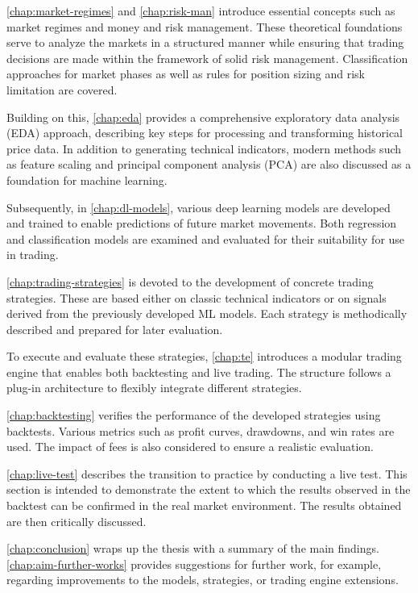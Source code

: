 \autoref{chap:market-regimes} and \autoref{chap:risk-man} introduce essential concepts such as market regimes and money and risk management.
These theoretical foundations serve to analyze the markets in a structured manner while ensuring that trading decisions are made within the framework of solid risk management.
Classification approaches for market phases as well as rules for position sizing and risk limitation are covered.


Building on this, \autoref{chap:eda} provides a comprehensive exploratory data analysis (EDA) approach, describing key steps for processing and transforming historical price data.
In addition to generating technical indicators, modern methods such as feature scaling and principal component analysis (PCA) are also discussed as a foundation for machine learning.

Subsequently, in \autoref{chap:dl-models}, various deep learning models are developed and trained to enable predictions of future market movements.
Both regression and classification models are examined and evaluated for their suitability for use in trading.

\autoref{chap:trading-strategies} is devoted to the development of concrete trading strategies.
These are based either on classic technical indicators or on signals derived from the previously developed ML models.
Each strategy is methodically described and prepared for later evaluation.

To execute and evaluate these strategies, \autoref{chap:te} introduces a modular trading engine that enables both backtesting and live trading.
The structure follows a plug-in architecture to flexibly integrate different strategies.

\autoref{chap:backtesting} verifies the performance of the developed strategies using backtests.
Various metrics such as profit curves, drawdowns, and win rates are used.
The impact of fees is also considered to ensure a realistic evaluation.

\autoref{chap:live-test} describes the transition to practice by conducting a live test.
This section is intended to demonstrate the extent to which the results observed in the backtest can be confirmed in the real market environment.
The results obtained are then critically discussed.

\autoref{chap:conclusion} wraps up the thesis with a summary of the main findings.
\autoref{chap:aim-further-works} provides suggestions for further work, for example, regarding improvements to the models, strategies, or trading engine extensions.